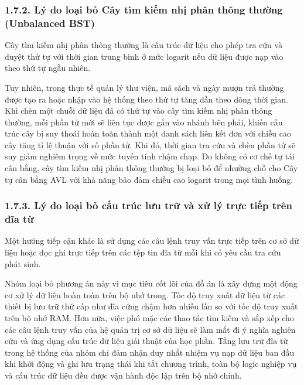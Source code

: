 \documentclass[14pt,a4paper]{extarticle}
\begin{document}
\subsubsection*{1.7.2. Lý do loại bỏ Cây tìm kiếm nhị phân thông thường (Unbalanced BST)}

Cây tìm kiếm nhị phân thông thường là cấu trúc dữ liệu cho phép tra cứu và duyệt thứ tự với thời gian trung bình ở mức logarit nếu dữ liệu được nạp vào theo thứ tự ngẫu nhiên.

Tuy nhiên, trong thực tế quản lý thư viện, mã sách và ngày mượn trả thường được tạo ra hoặc nhập vào hệ thống theo thứ tự tăng dần theo dòng thời gian. Khi chèn một chuỗi dữ liệu đã có thứ tự vào cây tìm kiếm nhị phân thông thường, mỗi phần tử mới sẽ liên tục được gắn vào nhánh bên phải, khiến cấu trúc cây bị suy thoái hoàn toàn thành một danh sách liên kết đơn với chiều cao cây tăng tỉ lệ thuận với số phần tử. Khi đó, thời gian tra cứu và chèn phần tử sẽ suy giảm nghiêm trọng về mức tuyến tính chậm chạp. Do không có cơ chế tự tái cân bằng, cây tìm kiếm nhị phân thông thường bị loại bỏ để nhường chỗ cho Cây tự cân bằng AVL với khả năng bảo đảm chiều cao logarit trong mọi tình huống.

\subsubsection*{1.7.3. Lý do loại bỏ cấu trúc lưu trữ và xử lý trực tiếp trên đĩa từ}

Một hướng tiếp cận khác là sử dụng các câu lệnh truy vấn trực tiếp trên cơ sở dữ liệu hoặc đọc ghi trực tiếp trên các tệp tin đĩa từ mỗi khi có yêu cầu tra cứu phát sinh.

Nhóm loại bỏ phương án này vì mục tiêu cốt lõi của đồ án là xây dựng một động cơ xử lý dữ liệu hoàn toàn trên bộ nhớ trong. Tốc độ truy xuất dữ liệu từ các thiết bị lưu trữ thứ cấp như đĩa cứng chậm hơn nhiều lần so với tốc độ truy xuất trên bộ nhớ RAM. Hơn nữa, việc phó mặc các thao tác tìm kiếm và sắp xếp cho các câu lệnh truy vấn của hệ quản trị cơ sở dữ liệu sẽ làm mất đi ý nghĩa nghiên cứu và ứng dụng cấu trúc dữ liệu giải thuật của học phần. Tầng lưu trữ đĩa từ trong hệ thống của nhóm chỉ đảm nhận duy nhất nhiệm vụ nạp dữ liệu ban đầu khi khởi động và ghi lưu trạng thái khi tắt chương trình, toàn bộ logic nghiệp vụ và cấu trúc dữ liệu đều được vận hành độc lập trên bộ nhớ chính.
\end{document}
